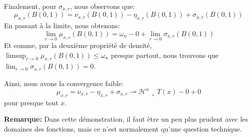 \documentclass{article}
\begin{document}
\vspace{1ex}
Finalement, pour $\sigma_{x,r}$, nous observons que:
\[\mu_{x,r}(B(0,1))=\nu_{x,r}(B(0,1))-\eta_{x,r}(B(0,1))+\sigma_{x,r}(B(0,1))\]
En passant à la limite, nous obtenons:
\[\lim_{r\to 0}\mu_{x,r}(B(0,1))=\omega_n-0+\lim_{r\to 0}\sigma_{x,r}(B(0,1))\]
Et comme, par la deuxième propriété de densité, $\limsup_{r\to 0}\mu_{x,r}(B(0,1))
\le \omega_n$ presque partout, nous trouvons que $\lim_{r\to 0}\sigma_{x,r}(B(0,1))=0$.

Ainsi, nous avons la convergence faible:
\[\mu_{x,r}=\nu_{x,r}-\eta_{x,r}+\sigma_{x,r}\rightharpoonup\mathcal H^n\,\llcorner T(x)-0+0\]
pour presque tout $x$.

\vspace{1ex}
\textbf{Remarque:} Dans cette démonstration, il faut être un peu plus prudent
avec les domaines des fonctions, mais ce n'est normalement qu'une question
technique.
\end{document}
